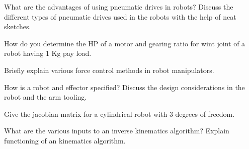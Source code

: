 \newpage \again

\item \iitem What are the advantages of using pneumatic drives in robots? Discuss the
  different types of pneumatic drives used in the robots with the help of
  neat sketches.
\Or
\item How do you determine the HP of a motor and gearing ratio for wint joint 
  of a robot having 1 Kg pay load.
\ene

\item \iitem Briefly explain various force control methods in robot manipulators.
\Or
\item How is a robot and effector specified? Discuss the design considerations
  in the robot and the arm tooling.
\ene

\item \iitem Give the jacobian matrix for a cylindrical robot with 3 degrees of freedom.
\Or
\item What are the various inputs to an inverse kinematics
  algorithm? Explain functioning of an kinematics algorithm.
\ene

\markC
\ene
